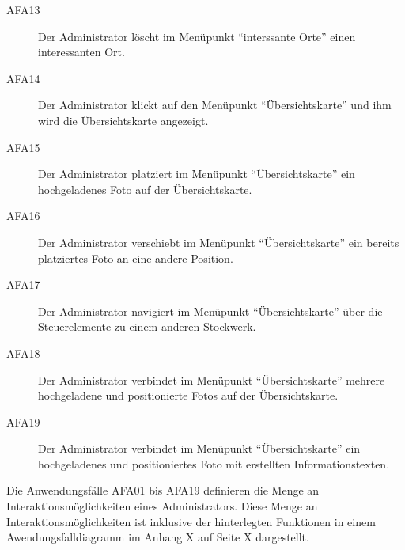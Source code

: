 \begin{description}
  \item[AFA13] Der Administrator löscht im Menüpunkt "`interssante Orte"' einen
  interessanten Ort.
  \item[AFA14] Der Administrator klickt auf den Menüpunkt "`Übersichtskarte"'
  und ihm wird die Übersichtskarte angezeigt.
  \item[AFA15] Der Administrator platziert im Menüpunkt "`Übersichtskarte"' ein
  hochgeladenes Foto auf der Übersichtskarte.
  \item[AFA16] Der Administrator verschiebt im Menüpunkt "`Übersichtskarte"' ein
  bereits platziertes Foto an eine andere Position.
  \item[AFA17] Der Administrator navigiert im Menüpunkt "`Übersichtskarte"' über
  die Steuerelemente zu einem anderen Stockwerk.
  \item[AFA18] Der Administrator verbindet im Menüpunkt "`Übersichtskarte"'
  mehrere hochgeladene und positionierte Fotos auf der Übersichtskarte.
  \item[AFA19] Der Administrator verbindet im Menüpunkt "`Übersichtskarte"' ein
  hochgeladenes und positioniertes Foto mit erstellten Informationstexten.
\end{description}

Die Anwendungsfälle AFA01 bis AFA19 definieren die Menge an
Interaktionsmöglichkeiten eines Administrators. Diese Menge an
Interaktionsmöglichkeiten ist inklusive der hinterlegten Funktionen in einem
Awendungsfalldiagramm im Anhang X auf Seite X dargestellt.
